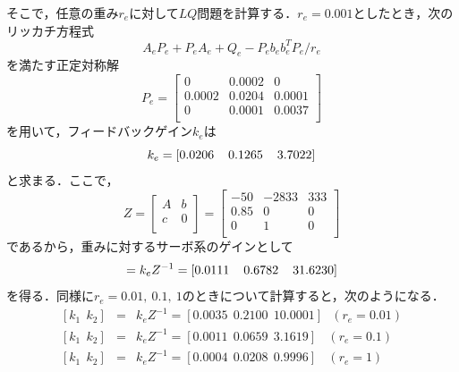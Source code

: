 \documentclass[a4paper,12pt]{jarticle}
\begin{document}
そこで，任意の重み$ r_e $に対して$ LQ $問題を計算する．$ r_e = 0.001 $としたとき，次のリッカチ方程式
%
\begin{equation}
 A_e P_e + P_e A_e + Q_e - P_e b_e b_e^T P_e / r_e
\end{equation}
%
を満たす正定対称解
%
\begin{equation}
 P_e =
 \left[
  \begin{array}{ccc}
   0 & 0.0002 & 0 \\
   0.0002 & 0.0204 & 0.0001 \\
   0 & 0.0001 & 0.0037 \\
  \end{array}
 \right]
\end{equation}
%
を用いて，フィードバックゲイン$ k_e $は
%
\begin{equation}
 k_e = [ 0.0206 \hspace{4mm} 0.1265 \hspace{4mm} 3.7022 ]
\end{equation}
%
と求まる．ここで，
%
\begin{equation}
 Z =
 \left[
  \begin{array}{cc}
   A & b \\
   c & 0 \\
  \end{array}
 \right]
 =
 \left[
  \begin{array}{ccc}
   -50 & -2833 & 333 \\
   0.85 & 0 & 0 \\
   0 & 1 & 0 \\
  \end{array}
 \right]
\end{equation}
%
であるから，重みに対するサーボ系のゲインとして
\begin{equation}
 [k_1 \hspace{4mm} k_2] = k_e Z^{-1} = [0.0111 \hspace{4mm} 0.6782 \hspace{4mm} 31.6230]
\end{equation}
%
を得る．同様に$ r_e = 0.01, ~ 0.1, ~ 1 $のときについて計算すると，次のようになる．
%
\begin{eqnarray}
  \left[ k_1 ~~ k_2 \right] & = & k_e Z^{-1} = [0.0035 ~~ 0.2100 ~~ 10.0001]~~~(r_e = 0.01) \\
  \left[ k_1 ~~ k_2 \right] & = & k_e Z^{-1} = [0.0011 ~~ 0.0659 ~~ 3.1619]~~~~(r_e = 0.1) \\
  \left[ k_1 ~~ k_2 \right] & = & k_e Z^{-1} = [0.0004 ~~ 0.0208 ~~ 0.9996]~~~~(r_e = 1)
\end{eqnarray}
\end{document}
